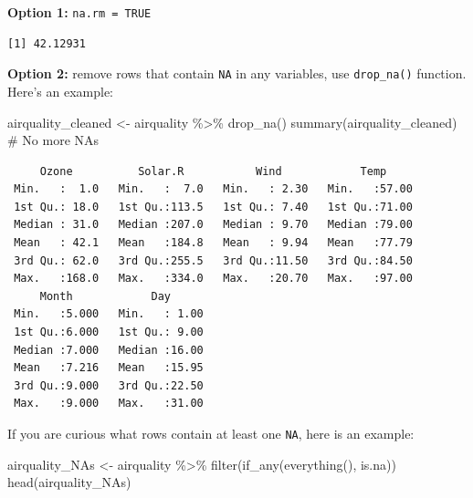 \documentclass[
  letterpaper,
  DIV=11,
  numbers=noendperiod]{scrreprt}
\newenvironment{Shaded}{\begin{snugshade}}{\end{snugshade}}
\newcommand{\AttributeTok}[1]{\textcolor[rgb]{0.40,0.45,0.13}{#1}}
\newcommand{\CommentTok}[1]{\textcolor[rgb]{0.37,0.37,0.37}{#1}}
\newcommand{\ConstantTok}[1]{\textcolor[rgb]{0.56,0.35,0.01}{#1}}
\newcommand{\FunctionTok}[1]{\textcolor[rgb]{0.28,0.35,0.67}{#1}}
\newcommand{\NormalTok}[1]{\textcolor[rgb]{0.00,0.23,0.31}{#1}}
\newcommand{\OtherTok}[1]{\textcolor[rgb]{0.00,0.23,0.31}{#1}}
\newcommand{\SpecialCharTok}[1]{\textcolor[rgb]{0.37,0.37,0.37}{#1}}
\begin{document}
\textbf{Option 1:} \texttt{na.rm\ =\ TRUE}

\begin{Shaded}
\end{Shaded}

\begin{verbatim}
[1] 42.12931
\end{verbatim}

\textbf{Option 2:} remove rows that contain \texttt{NA} in any
variables, use \texttt{drop\_na()} function. Here's an example:

\begin{Shaded}
\begin{Highlighting}[]
\NormalTok{airquality\_cleaned }\OtherTok{\textless{}{-}}\NormalTok{ airquality }\SpecialCharTok{\%\textgreater{}\%}
                        \FunctionTok{drop\_na}\NormalTok{()}
\FunctionTok{summary}\NormalTok{(airquality\_cleaned) }\CommentTok{\# No more NA\textquotesingle{}s}
\end{Highlighting}
\end{Shaded}

\begin{verbatim}
     Ozone          Solar.R           Wind            Temp      
 Min.   :  1.0   Min.   :  7.0   Min.   : 2.30   Min.   :57.00  
 1st Qu.: 18.0   1st Qu.:113.5   1st Qu.: 7.40   1st Qu.:71.00  
 Median : 31.0   Median :207.0   Median : 9.70   Median :79.00  
 Mean   : 42.1   Mean   :184.8   Mean   : 9.94   Mean   :77.79  
 3rd Qu.: 62.0   3rd Qu.:255.5   3rd Qu.:11.50   3rd Qu.:84.50  
 Max.   :168.0   Max.   :334.0   Max.   :20.70   Max.   :97.00  
     Month            Day       
 Min.   :5.000   Min.   : 1.00  
 1st Qu.:6.000   1st Qu.: 9.00  
 Median :7.000   Median :16.00  
 Mean   :7.216   Mean   :15.95  
 3rd Qu.:9.000   3rd Qu.:22.50  
 Max.   :9.000   Max.   :31.00  
\end{verbatim}

If you are curious what rows contain at least one \texttt{NA}, here is
an example:

\begin{Shaded}
\begin{Highlighting}[]
\NormalTok{airquality\_NAs }\OtherTok{\textless{}{-}}\NormalTok{ airquality }\SpecialCharTok{\%\textgreater{}\%}
                    \FunctionTok{filter}\NormalTok{(}\FunctionTok{if\_any}\NormalTok{(}\FunctionTok{everything}\NormalTok{(), is.na))}
\FunctionTok{head}\NormalTok{(airquality\_NAs)}
\end{Highlighting}
\end{Shaded}
\end{document}
